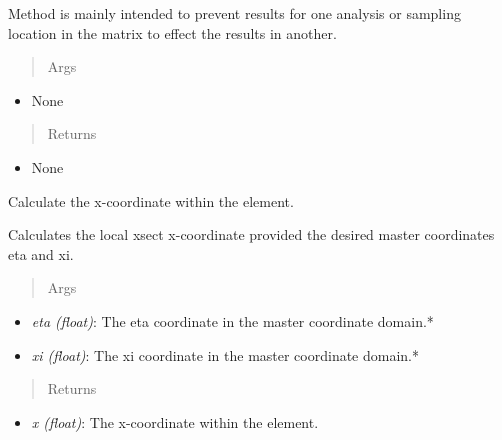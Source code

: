 \documentclass[letterpaper,10pt,english]{sphinxmanual}
\begin{document}
\begin{fulllineitems}
\begin{fulllineitems}
Method is mainly intended to prevent results for one analysis or
sampling location in the matrix to effect the results in another.
\begin{quote}\begin{description}
\item[{Args}] \leavevmode
\end{description}\end{quote}
\begin{itemize}
\item {} 
None

\end{itemize}
\begin{quote}\begin{description}
\item[{Returns}] \leavevmode
\end{description}\end{quote}
\begin{itemize}
\item {} 
None

\end{itemize}

\end{fulllineitems}


\begin{fulllineitems}
\label{structures:AeroComBAT.Structures.CQUADX.x}
Calculate the x-coordinate within the element.

Calculates the local xsect x-coordinate provided the desired master
coordinates eta and xi.
\begin{quote}\begin{description}
\item[{Args}] \leavevmode
\end{description}\end{quote}
\begin{itemize}
\item {} 
\emph{eta (float)}: The eta coordinate in the master coordinate domain.*

\item {} 
\emph{xi (float)}: The xi coordinate in the master coordinate domain.*

\end{itemize}
\begin{quote}\begin{description}
\item[{Returns}] \leavevmode
\end{description}\end{quote}
\begin{itemize}
\item {} 
\emph{x (float)}: The x-coordinate within the element.


\end{itemize}
\end{fulllineitems}
\end{fulllineitems}
\end{document}
